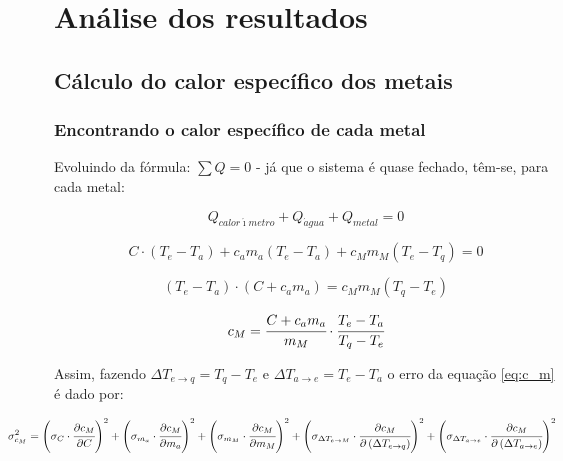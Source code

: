 \documentclass[a4paper]{article}
\begin{document}
	\section{Análise dos resultados}


		\subsection{Cálculo do calor específico dos metais}


			\subsubsection{Encontrando o calor específico de cada metal}

				Evoluindo da fórmula: $\sum Q=0$ - já que o sistema é quase fechado,
				têm-se, para cada metal:

				\begin{equation}
					Q_{calor\acute{\imath}metro}+Q_{\acute{a}gua}+Q_{metal}=0
				\end{equation}


				\[
					C\cdot\left(T_{e}-T_{a}\right)+c_{a}m_{a}\left(T_{e}-T_{a}\right)+c_{M}m_{M}\left(T_{e}-T_{q}\right)=0
				\]


				\[
					\left(T_{e}-T_{a}\right)\cdot\left(C+c_{a}m_{a}\right)=c_{M}m_{M}\left(T_{q}-T_{e}\right)
				\]


				\begin{equation}
					c_{M}=\cfrac{C+c_{a}m_{a}}{m_{M}}\cdot\cfrac{T_{e}-T_{a}}{T_{q}-T_{e}}\label{eq:c_m}
				\end{equation}


				Assim, fazendo $\Delta T_{e\rightarrow q}=T_{q}-T_{e}$ e $\Delta T_{a\rightarrow e}=T_{e}-T_{a}$
				o erro da equação \eqref{eq:c_m} é dado por:

				\begin{equation}
					\hspace{-1,5cm}
					\sigma_{c_{M}}^{2}=
						\left(\sigma_{C}\cdot\cfrac{\partial c_{M}}{\partial C}\right)^{2}+
						\left(\sigma_{m_{a}}\cdot\cfrac{\partial c_{M}}{\partial m_{a}}\right)^{2}+
						\left(\sigma_{m_{M}}\cdot\cfrac{\partial c_{M}}{\partial m_{M}}\right)^{2}+
						\left(\sigma_{\Delta T_{e\rightarrow M}}\cdot\cfrac{\partial c_{M}}{\partial
						\left(\Delta T_{e\rightarrow q}\right)}\right)^{2}+
						\left(\sigma_{\Delta T_{a\rightarrow e}}\cdot\cfrac{\partial c_{M}}{\partial
						\left(\Delta T_{a\rightarrow e}\right)}\right)^{2}
				\end{equation}
\end{document}
